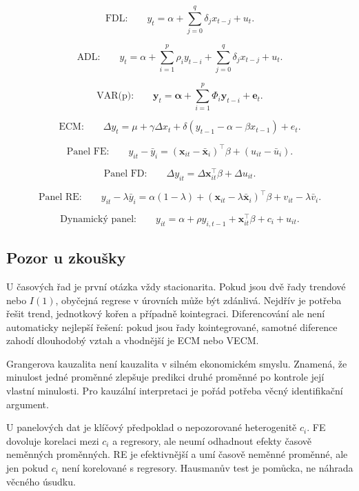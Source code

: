 \[
    \text{FDL:}\qquad
    y_t=\alpha+\sum_{j=0}^{q}\delta_jx_{t-j}+u_t.
\]

\[
    \text{ADL:}\qquad
    y_t=
    \alpha+
    \sum_{i=1}^{p}\rho_i y_{t-i}
    +
    \sum_{j=0}^{q}\delta_jx_{t-j}
    +u_t.
\]

\[
    \text{VAR(p):}\qquad
    \mathbf y_t
    =
    \boldsymbol\alpha
    +
    \sum_{i=1}^{p}\Phi_i\mathbf y_{t-i}
    +
    \mathbf e_t.
\]

\[
    \text{ECM:}\qquad
    \Delta y_t =
    \mu+\gamma\Delta x_t
    +\delta(y_{t-1}-\alpha-\beta x_{t-1})
    +e_t.
\]

\[
    \text{Panel FE:}\qquad
    y_{it}-\bar y_i
    =
    (\mathbf x_{it}-\bar{\mathbf x}_i)^\top\beta
    +
    (u_{it}-\bar u_i).
\]

\[
    \text{Panel FD:}\qquad
    \Delta y_{it}
    =
    \Delta \mathbf x_{it}^\top\beta
    +
    \Delta u_{it}.
\]

\[
    \text{Panel RE:}\qquad
    y_{it}-\lambda\bar y_i
    =
    \alpha(1-\lambda)
    +
    (\mathbf x_{it}-\lambda\bar{\mathbf x}_i)^\top\beta
    +
    v_{it}-\lambda\bar v_i.
\]

\[
    \text{Dynamický panel:}\qquad
    y_{it}
    =
    \alpha
    +
    \rho y_{i,t-1}
    +
    \mathbf x_{it}^\top\beta
    +
    c_i
    +
    u_{it}.
\]

\subsection{Pozor u zkoušky}

U časových řad je první otázka vždy stacionarita. Pokud jsou dvě řady trendové nebo $I(1)$, obyčejná
regrese v úrovních může být zdánlivá. Nejdřív je potřeba řešit trend, jednotkový kořen a případně
kointegraci. Diferencování ale není automaticky nejlepší řešení: pokud jsou řady kointegrované, samotné
diference zahodí dlouhodobý vztah a vhodnější je ECM nebo VECM.

Grangerova kauzalita není kauzalita v silném ekonomickém smyslu. Znamená, že minulost jedné proměnné
zlepšuje predikci druhé proměnné po kontrole její vlastní minulosti. Pro kauzální interpretaci je pořád
potřeba věcný identifikační argument.

U panelových dat je klíčový předpoklad o nepozorované heterogenitě $c_i$. FE dovoluje korelaci mezi
$c_i$ a regresory, ale neumí odhadnout efekty časově neměnných proměnných. RE je efektivnější a umí
časově neměnné proměnné, ale jen pokud $c_i$ není korelované s regresory. Hausmanův test je pomůcka,
ne náhrada věcného úsudku.

